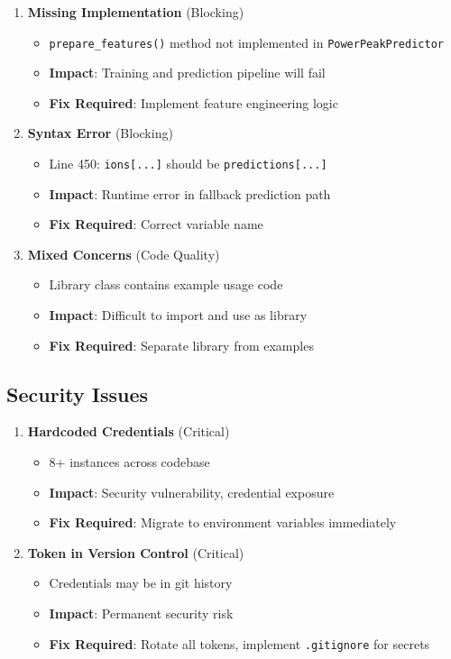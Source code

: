 \documentclass[11pt,a4paper]{article}
\begin{document}
\begin{enumerate}
    \item \textbf{Missing Implementation} (Blocking)
    \begin{itemize}
        \item \texttt{prepare\_features()} method not implemented in \texttt{PowerPeakPredictor}
        \item \textbf{Impact}: Training and prediction pipeline will fail
        \item \textbf{Fix Required}: Implement feature engineering logic
    \end{itemize}
    
    \item \textbf{Syntax Error} (Blocking)
    \begin{itemize}
        \item Line 450: \texttt{ions[...]} should be \texttt{predictions[...]}
        \item \textbf{Impact}: Runtime error in fallback prediction path
        \item \textbf{Fix Required}: Correct variable name
    \end{itemize}
    
    \item \textbf{Mixed Concerns} (Code Quality)
    \begin{itemize}
        \item Library class contains example usage code
        \item \textbf{Impact}: Difficult to import and use as library
        \item \textbf{Fix Required}: Separate library from examples
    \end{itemize}
\end{enumerate}

\subsection{Security Issues}

\begin{enumerate}
    \item \textbf{Hardcoded Credentials} (Critical)
    \begin{itemize}
        \item 8+ instances across codebase
        \item \textbf{Impact}: Security vulnerability, credential exposure
        \item \textbf{Fix Required}: Migrate to environment variables immediately
    \end{itemize}
    
    \item \textbf{Token in Version Control} (Critical)
    \begin{itemize}
        \item Credentials may be in git history
        \item \textbf{Impact}: Permanent security risk
        \item \textbf{Fix Required}: Rotate all tokens, implement \texttt{.gitignore} for secrets
    \end{itemize}
\end{enumerate}
\end{document}
